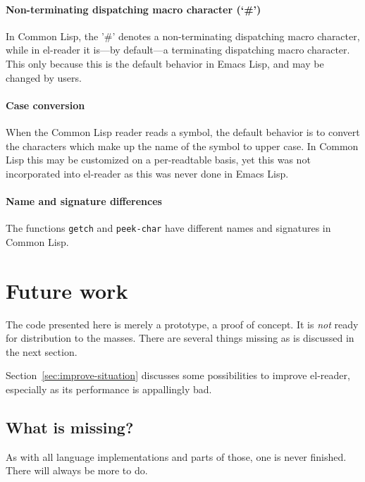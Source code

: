 \documentclass[a4paper,10pt,twoside]{report}
\newcommand{\el}{Emacs Lisp}
\newcommand{\cl}{Common Lisp}
\newcommand{\elr}{el-reader}
\newcommand{\fun}[1]{\texttt{#1}}
\begin{document}
\subsubsection{Non-terminating dispatching macro character (‘\#’)}
\label{subsubsec:non-term-dispatch}

In \cl{}, the ’\#’ denotes a non-terminating dispatching macro character, while
in \elr{} it is---by default---a terminating dispatching macro character.  This
only because this is the default behavior in \el{}, and may be changed by users.

\subsubsection{Case conversion}
\label{subsubsec:case-conversion}

When the \cl{} reader reads a symbol, the default behavior is to convert the
characters which make up the name of the symbol to upper case.  In \cl{} this
may be customized on a per-readtable basis, yet this was not incorporated into
\elr{} as this was never done in \el{}.

\subsubsection{Name and signature differences}
\label{subsubsec:name-diffs}

The functions \fun{getch} and \fun{peek-char} have different names and
signatures in \cl{}.

\chapter{Future work}
\label{chapter:future-work}

The code presented here is merely a prototype, a proof of concept.  It is
\emph{not} ready for distribution to the masses.  There are several things
missing as is discussed in the next section.

Section~\ref{sec:improve-situation} discusses some possibilities to improve
\elr{}, especially as its performance is appallingly bad.

\section{What is missing?}
\label{sec:missing}

As with all language implementations and parts of those, one is never finished.
There will always be more to do.
\end{document}
